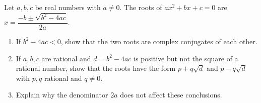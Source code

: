 Let $a,b,c$ be real numbers with $a\ne0$. The roots of $ax^2+bx+c=0$ are $x=\dfrac{-b\pm\sqrt{b^2-4ac}}{2a}$.
\begin{enumerate}
\item[(a)] If $b^2-4ac<0$, show that the two roots are complex conjugates of each other.
\item[(b)] If $a,b,c$ are rational and $d=b^2-4ac$ is positive but not the square of a rational number, show that the roots have the form $p+q\sqrt d$ and $p-q\sqrt d$ with $p,q$ rational and $q\ne0$.
\item[(c)] Explain why the denominator $2a$ does not affect these conclusions.
\end{enumerate}
